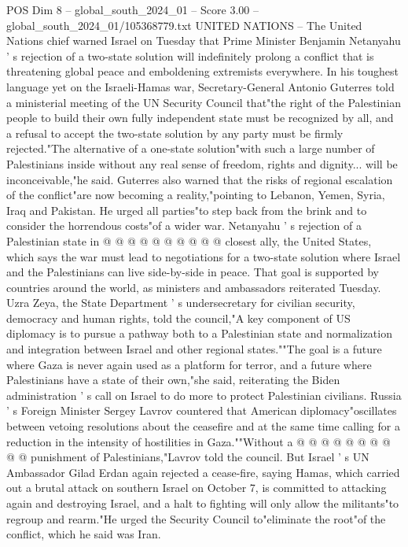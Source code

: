 \begin{textsample}{POS Dim 8 – global\_south\_2024\_01 – Score 3.00 – global\_south\_2024\_01/105368779.txt}  \label{ex:f8_pos_394}
UNITED NATIONS -- The United Nations chief warned Israel on Tuesday that Prime Minister Benjamin Netanyahu ' s rejection of a two-state solution will indefinitely prolong a conflict that is threatening global peace and emboldening extremists everywhere.
In his toughest language yet on the Israeli-Hamas war, Secretary-General Antonio Guterres told a ministerial meeting of the UN Security Council that"the right of the Palestinian people to build their own fully independent state must be recognized by all, and a refusal to accept the two-state solution by any party must be firmly rejected."The alternative of a one-state solution"with such a large number of Palestinians inside without any real sense of freedom, rights and dignity... will be inconceivable,"he said.
Guterres also warned that the risks of regional escalation of the conflict"are now becoming a reality,"pointing to Lebanon, Yemen, Syria, Iraq and Pakistan.
He urged all parties"to step back from the brink and to consider the horrendous costs"of a wider war.
Netanyahu ' s rejection of a Palestinian state in @ @ @ @ @ @ @ @ @ @ closest ally, the United States, which says the war must lead to negotiations for a two-state solution where Israel and the Palestinians can live side-by-side in peace.
That goal is supported by countries around the world, as ministers and ambassadors reiterated Tuesday.
Uzra Zeya, the State Department ' s undersecretary for civilian security, democracy and human rights, told the council,"A key component of US diplomacy is to pursue a pathway both to a Palestinian state and normalization and integration between Israel and other regional states.""The goal is a future where Gaza is never again used as a platform for terror, and a future where Palestinians have a state of their own,"she said, reiterating the Biden administration ' s call on Israel to do more to protect Palestinian civilians.
Russia ' s Foreign Minister Sergey Lavrov countered that American diplomacy"oscillates between vetoing resolutions about the ceasefire and at the same time calling for a reduction in the intensity of hostilities in Gaza.""Without a @ @ @ @ @ @ @ @ @ @ punishment of Palestinians,"Lavrov told the council.
But Israel ' s UN Ambassador Gilad Erdan again rejected a cease-fire, saying Hamas, which carried out a brutal attack on southern Israel on October 7, is committed to attacking again and destroying Israel, and a halt to fighting will only allow the militants"to regroup and rearm."He urged the Security Council to"eliminate the root"of the conflict, which he said was Iran.

\end{textsample}
